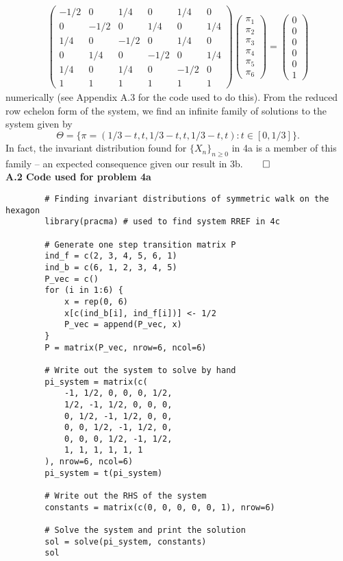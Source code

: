 \documentclass[11pt, letterpaper]{article}
\begin{document}
    \begin{align*}
        \begin{pmatrix}
            -1/2 & 0 & 1/4 & 0 & 1/4 & 0\\
            0 & -1/2 & 0 & 1/4 & 0 & 1/4\\
            1/4 & 0 & -1/2 & 0 & 1/4 & 0\\
            0 & 1/4 & 0 & -1/2 & 0 & 1/4\\
            1/4 & 0 & 1/4 & 0 & -1/2 & 0\\
            1 & 1 & 1 & 1 & 1 & 1
        \end{pmatrix}\begin{pmatrix}
            \pi_1\\
            \pi_2\\
            \pi_3\\
            \pi_4\\
            \pi_5\\
            \pi_6
        \end{pmatrix}=\begin{pmatrix}
            0\\
            0\\
            0\\
            0\\
            0\\
            1
        \end{pmatrix}
    \end{align*}
    numerically (see Appendix A.3 for the code used to do this). From the reduced row echelon form of the system, we find an infinite family of solutions to the system given by
    \[\Theta=\{\pi=(1/3-t,t,1/3-t,t,1/3-t,t):t\in[0,1/3]\}.\]
    In fact, the invariant distribution found for $\{X_n\}_{n\geq 0}$ in 4a is a member of this family -- an expected consequence given our result in 3b.\hfill{$\qed$}\\[10pt]
    {\bf A.2 Code used for problem 4a}
    \begin{verbatim}
        # Finding invariant distributions of symmetric walk on the hexagon
        library(pracma) # used to find system RREF in 4c

        # Generate one step transition matrix P
        ind_f = c(2, 3, 4, 5, 6, 1)
        ind_b = c(6, 1, 2, 3, 4, 5)
        P_vec = c()
        for (i in 1:6) {
            x = rep(0, 6)
            x[c(ind_b[i], ind_f[i])] <- 1/2
            P_vec = append(P_vec, x)
        }
        P = matrix(P_vec, nrow=6, ncol=6)

        # Write out the system to solve by hand
        pi_system = matrix(c(
            -1, 1/2, 0, 0, 0, 1/2,
            1/2, -1, 1/2, 0, 0, 0,
            0, 1/2, -1, 1/2, 0, 0,
            0, 0, 1/2, -1, 1/2, 0,
            0, 0, 0, 1/2, -1, 1/2,
            1, 1, 1, 1, 1, 1
        ), nrow=6, ncol=6)
        pi_system = t(pi_system)

        # Write out the RHS of the system
        constants = matrix(c(0, 0, 0, 0, 0, 1), nrow=6)

        # Solve the system and print the solution
        sol = solve(pi_system, constants)
        sol
    \end{verbatim}
\end{document}
